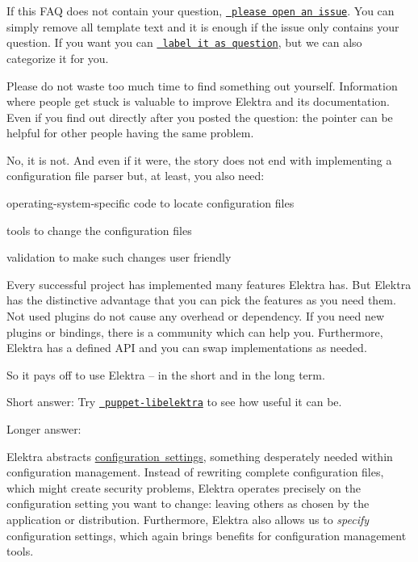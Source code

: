 If this F\+AQ does not contain your question, \href{https://git.libelektra.org/issues}{\texttt{ please open an issue}}. You can simply remove all template text and it is enough if the issue only contains your question. If you want you can \href{https://git.libelektra.org/issues/labels/question}{\texttt{ label it as question}}, but we can also categorize it for you.

Please do not waste too much time to find something out yourself. Information where people get stuck is valuable to improve Elektra and its documentation. Even if you find out directly after you posted the question\+: the pointer can be helpful for other people having the same problem.

No, it is not. And even if it were, the story does not end with implementing a configuration file parser but, at least, you also need\+:


\begin{DoxyItemize}
\item operating-\/system-\/specific code to locate configuration files
\item tools to change the configuration files
\item validation to make such changes user friendly
\end{DoxyItemize}

Every successful project has implemented many features Elektra has. But Elektra has the distinctive advantage that you can pick the features as you need them. Not used plugins do not cause any overhead or dependency. If you need new plugins or bindings, there is a community which can help you. Furthermore, Elektra has a defined A\+PI and you can swap implementations as needed.

So it pays off to use Elektra -- in the short and in the long term.

Short answer\+: Try \href{https://puppet.libelektra.org}{\texttt{ puppet-\/libelektra}} to see how useful it can be.

Longer answer\+:

Elektra abstracts \mbox{\hyperlink{doc_help_elektra-glossary_md}{configuration settings}}, something desperately needed within configuration management. Instead of rewriting complete configuration files, which might create security problems, Elektra operates precisely on the configuration setting you want to change\+: leaving others as chosen by the application or distribution. Furthermore, Elektra also allows us to {\itshape specify} configuration settings, which again brings benefits for configuration management tools.

